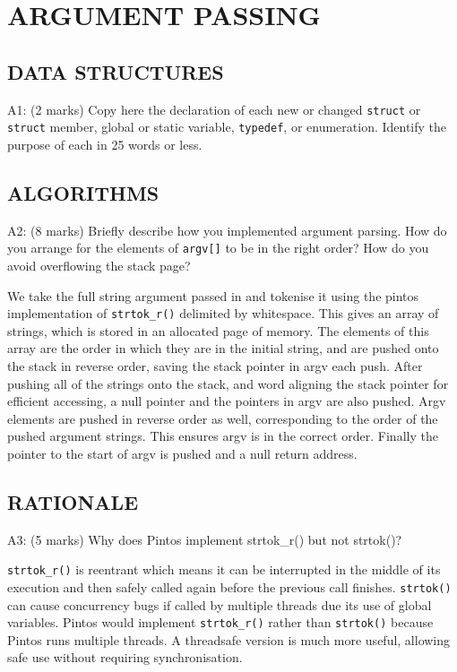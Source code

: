 \section{ARGUMENT PASSING}

\subsection*{DATA STRUCTURES}

\noindent A1: (2 marks)
Copy here the declaration of each new or changed \texttt{struct} or \texttt{struct} member, global or static variable, \texttt{typedef}, or enumeration.  Identify the purpose of each in 25 words or less.

\subsection*{ALGORITHMS}

\noindent A2: (8 marks)
Briefly describe how you implemented argument parsing.  How do
you arrange for the elements of \texttt{argv[]} to be in the right order?
How do you avoid overflowing the stack page?

We take the full string argument passed in and tokenise it using the pintos implementation of \texttt{strtok\_r()} delimited by whitespace. This gives an array of strings, which is stored in an allocated page of memory. The elements of this array are the order in which they are in the initial string, and are pushed onto the stack in reverse order, saving the stack pointer in argv each push. After pushing all of the strings onto the stack, and word aligning the stack pointer for efficient accessing, a null pointer and the pointers in argv are also pushed. Argv elements are pushed in reverse order as well, corresponding to the order of the pushed argument strings. This ensures argv is in the correct order. Finally the pointer to the start of argv is pushed and a null return address.


\subsection*{RATIONALE}

\noindent A3: (5 marks)
Why does Pintos implement strtok\_r() but not strtok()?

\texttt{strtok\_r()} is reentrant which means it can be interrupted in the middle of its execution and then safely called again before the previous call finishes. \texttt{strtok()} can cause concurrency bugs if called by multiple threads due its use of global variables. Pintos would implement \texttt{strtok\_r()} rather than \texttt{strtok()} because Pintos runs multiple threads. A threadsafe version is much more useful, allowing safe use without requiring synchronisation.

